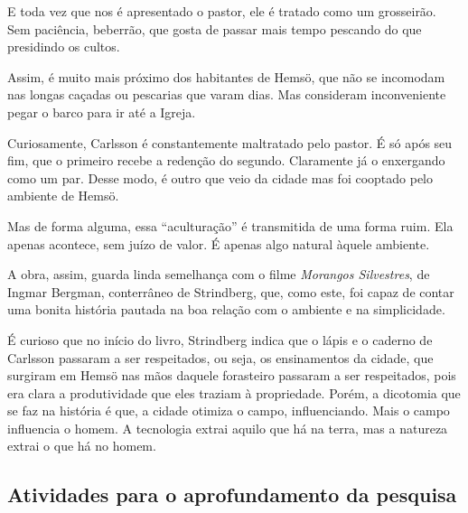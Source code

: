 \documentclass[12pt]{extarticle}
\begin{document}
E toda vez que nos é apresentado o pastor, ele é tratado como um
grosseirão. Sem paciência, beberrão, que gosta de passar mais tempo
pescando do que presidindo os cultos.

Assim, é muito mais próximo dos habitantes de Hemsö, que não se
incomodam nas longas caçadas ou pescarias que varam dias. Mas consideram
inconveniente pegar o barco para ir até a Igreja.

Curiosamente, Carlsson é constantemente maltratado pelo pastor. É só
após seu fim, que o primeiro recebe a redenção do segundo. Claramente já
o enxergando como um par. Desse modo, é outro que veio da cidade mas foi
cooptado pelo ambiente de Hemsö.

Mas de forma alguma, essa ``aculturação'' é transmitida de uma forma
ruim. Ela apenas acontece, sem juízo de valor. É apenas algo natural
àquele ambiente.

A obra, assim, guarda linda semelhança com o filme 
\textit{Morangos Silvestres}, de Ingmar Bergman, conterrâneo de Strindberg, 
que, como este, foi capaz de contar uma bonita história pautada na boa 
relação com o ambiente e na simplicidade.




É curioso que no início do livro, Strindberg indica que o lápis e o
caderno de Carlsson passaram a ser respeitados, ou seja, os ensinamentos
da cidade, que surgiram em Hemsö nas mãos daquele forasteiro passaram a
ser respeitados, pois era clara a produtividade que eles traziam à
propriedade. Porém, a dicotomia que se faz na história é que, a cidade
otimiza o campo, influenciando. Mais o campo influencia o homem. A
tecnologia extrai aquilo que há na terra, mas a natureza extrai o que há
no homem.




\subsection{Atividades para o aprofundamento da pesquisa}

\end{document}
